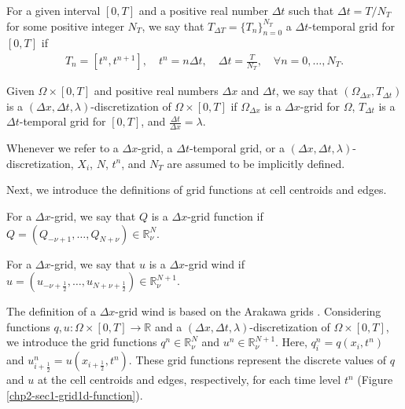 \begin{definition}
	For a given interval $[0,T]$ and a positive real number $\Delta t$ such that $\Delta t = T/N_T$
    for some positive integer $N_T$, we say that  $T_{\Delta T}= \{T_n\}_{n=0}^{N_T}$ a $\Delta t$-temporal grid for $[0,T]$ if
    \begin{align*}
	T_n = [t^n, t^{n+1}], \quad t^n = n\Delta t, \quad \Delta t = \frac{T}{N_T}, \quad \forall n = 0, \ldots, N_T.
    \end{align*}
\end{definition}
\begin{definition}
\label{chp2-def-dxtimegrid}
	Given $\Omega \times [0,T]$ and positive real numbers $\Delta x$ and $\Delta t$,
    we say that $(\Omega_{\Delta x}, T_{\Delta t})$ is a $(\Delta x, \Delta t, \lambda)$-discretization 
    of $\Omega \times [0,T]$ if $\Omega_{\Delta x}$ is a $\Delta x$-grid for $\Omega$, 
    ${T}_{\Delta t}$ is a $\Delta t$-temporal grid for $[0,T]$, and $\frac{\Delta t}{\Delta x} = \lambda$.
\end{definition}
\begin{remark}
	Whenever we refer to a $\Delta x$-grid, a $\Delta t$-temporal grid, or a $(\Delta x, \Delta t, \lambda)$-discretization, 
	$X_i$, $N$, $t^n$, and $N_T$ are assumed to be implicitly defined.
\end{remark}
Next, we introduce the definitions of grid functions at cell centroids and edges.
\begin{definition}
	For a $\Delta x$-grid, we say that $Q$ is a $\Delta x$-grid function if
	$Q = (Q_{-\nu+1}, \ldots, Q_{N+\nu}) \in \mathbb{R}^{N}_{\nu}$.
\end{definition}
\begin{definition}
	For a $\Delta x$-grid, we say that $u$ is a $\Delta x$-grid wind if
	$u = (u_{-\nu+\frac{1}{2}}, \ldots, u_{N+\nu+\frac{1}{2}}) \in \mathbb{R}^{N+1}_{\nu}$.
\end{definition}
The definition of a $\Delta x$-grid wind is based on the Arakawa grids \citep{arakawa:1977}.
Considering functions $q, u: \Omega \times[0,T] \to \mathbb{R}$ and a $(\Delta x,\Delta t, \lambda)$-discretization
of $\Omega \times[0,T]$, we introduce the grid functions $q^n \in \mathbb{R}^{N}_{\nu}$ and $u^n \in \mathbb{R}^{N+1}_{\nu}$. 
Here, ${q}^n_{i} = {q}(x_i, t^{n})$ and $u^n_{i+\frac{1}{2}} = u(x_{i+\frac{1}{2}},t^n)$.
These grid functions represent the discrete values of $q$ and $u$ at the cell centroids and edges, respectively,
for each time level $t^n$ (Figure \ref{chp2-sec1-grid1d-function}).

